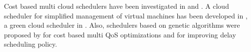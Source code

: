 Cost based multi cloud schedulers have been investigated in \cite{le2009cost} and \cite{tordsson2012cloud}. 
A cloud scheduler for simplified management of virtual machines has been developed in \cite{armstrong2010cloud}, a green cloud scheduler in \cite{lucanin2013take}. 
Also, schedulers based on genetic algorithms were proposed by \cite{dutta2011genetic} for cost based multi QoS optimizations and \cite{ge2010ga} for improving delay scheduling policy. 


%
%
%
%
%
%
